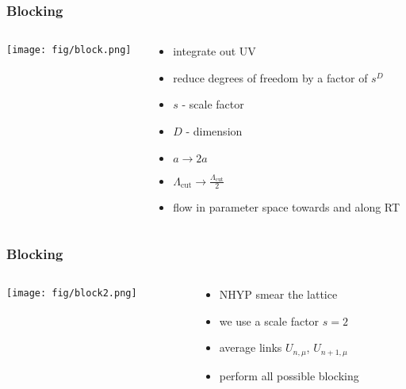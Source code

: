 \documentclass{beamer}
\begin{document}
  \begin{frame}
    \frametitle{Blocking}
    \begin{columns}[T]
      \begin{column}{.5\textwidth}
        \begin{block}{}
          \texttt{[image: fig/block.png]}
        \end{block}
      \end{column}
      \begin{column}{.5\textwidth}
        \begin{block}{}
          \begin{itemize}
            \item integrate out UV
            \item reduce degrees of freedom by a factor of $s^D$
            \item $s$ - scale factor
            \item $D$ - dimension
            \item $a \rightarrow 2a$
            \item $\Lambda_{\text{cut}} \rightarrow \tfrac{\Lambda_{\text{cut}}}{2}$
            \item flow in parameter space towards and along RT
          \end{itemize}
        \end{block}
      \end{column}
    \end{columns}
  \end{frame}

  \begin{frame}
    \frametitle{Blocking}
    \begin{columns}[T]
      \begin{column}{.5\textwidth}
        \begin{block}{}
          \texttt{[image: fig/block2.png]}
        \end{block}
      \end{column}
      \begin{column}{.5\textwidth}
        \begin{block}{}
          \begin{itemize}
            \item NHYP smear the lattice
            \item we use a scale factor $s=2$
            \item average links $U_{n,\mu}$, $U_{n+1,\mu}$
            \item perform all possible blocking
          \end{itemize}
        \end{block}
      \end{column}
    \end{columns}
  \end{frame}
\end{document}
